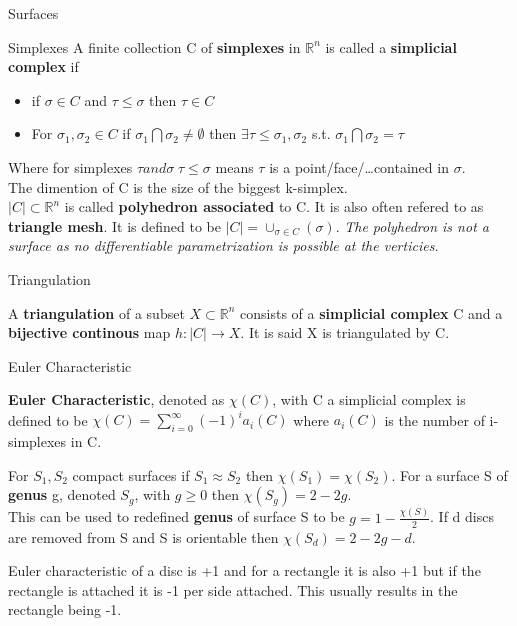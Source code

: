 \documentclass[12pt, letterpaper]{article}
\begin{document}
\begin{section}{Surfaces}
\begin{subsection}{Simplexes}
    A finite collection C of \textbf{simplexes} in \(\mathbb{R}^{n}\) is called
    a \textbf{simplicial complex } if
    \begin{itemize}
      \item if \(\sigma \in C\) and \(\tau \leq \sigma\) then \(\tau \in C\)
      \item For \(\sigma_{1}, \sigma_{2} \in C\) if
            \(\sigma_{1} \bigcap \sigma_{2} \neq \emptyset\) then
            \(\exists \tau \leq \sigma_{1}, \sigma_{2}\) s.t.
            \(\sigma_{1} \bigcap \sigma_{2} = \tau\)
    \end{itemize}
    Where for simplexes \(\tau and \sigma \; \tau \leq \sigma\) means \(\tau\)
    is a point/face/\dots contained in \(\sigma\). \\
    The dimention of C is the size of the biggest k-simplex. \\
    \(|C| \subset \mathbb{R}^{n}\) is called \textbf{polyhedron associated} to C.
    It is also often refered to as \textbf{triangle mesh}. It is defined to be
    \(|C| = \cup_{\sigma \in C} (\sigma)\).
    \emph{The polyhedron is not a surface as no differentiable parametrization
      is possible at the verticies.}

  \end{subsection}

  \begin{subsection}{Triangulation}

    A \textbf{triangulation} of a subset \(X \subset \mathbb{R}^{n}\) consists
    of a \textbf{simplicial complex} C and a \textbf{bijective continous} map
    \(h: |C| \to X\). It is said X is triangulated by C.

  \end{subsection}

  \begin{subsection}{Euler Characteristic}

    \textbf{Euler Characteristic}, denoted as \(\chi(C)\), with C a simplicial
    complex is defined to be \(\chi(C) = \sum_{i = 0}^{\infty} (-1)^{i}a_{i}(C)\)
    where \(a_{i}(C)\) is the number of i-simplexes in C.

    For \(S_{1}, S_{2}\) compact surfaces if \(S_{1} \approx S_{2}\) then
    \(\chi(S_{1}) = \chi(S_{2})\).
    For a surface S of \textbf{genus} g, denoted \(S_{g}\), with \(g \geq 0\)
    then \(\chi(S_{g}) = 2 - 2g\). \\
    This can be used to redefined \textbf{genus} of surface S to be
    \(g = 1 - \frac{\chi(S)}{2}\). If d discs are removed from S and S is
    orientable then \(\chi(S_{d}) = 2 - 2g -d\).

    Euler characteristic of a disc is +1 and for a rectangle it is also +1
    but if the rectangle is attached it is -1 per side attached. This usually
    results in the rectangle being -1.

  \end{subsection}

\end{section}
\end{document}
